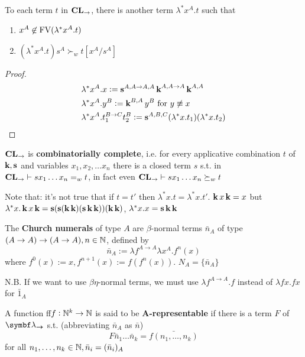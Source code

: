 \documentclass[11pt]{article}
\begin{document}
\begin{theorem}[]
To each term \(t\) in \(\operatorname{\textbf{CL}}_\to\), there is another term \(\lambda^*x^A.t\) such
that
\begin{enumerate}
\item \(x^A\not\in\text{FV}(\lambda^*x^A.t)\)
\item \((\lambda^*x^A.t)s^A\succ_wt[x^A/s^A]\)
\end{enumerate}
\end{theorem}
\begin{proof}
\begin{align*}
&\lambda^*x^A.x:=\operatorname{\textbf{s}}^{A,A\to A,A}\operatorname{\textbf{k}}^{A,A\to A}\operatorname{\textbf{k}}^{A,A}\\
&\lambda^*x^A.y^B:=\operatorname{\textbf{k}}^{B,A}y^B\text{ for }y\not\equiv x\\
&\lambda^*x^A.t_1^{B\to C}t_2^B:=\operatorname{\textbf{s}}^{A,B,C}(\lambda^*x.t_1)(\lambda^*x.t_2)
\end{align*}
\end{proof}

\begin{corollary}[]
\(\operatorname{\textbf{CL}}_\to\) is \textbf{combinatorially complete}, i.e. for every applicative
combination \(t\) of \(\operatorname{\textbf{k}},\operatorname{\textbf{s}}\) and variables \(x_1,x_2,\dots x_n\) there is a
closed term \(s\) s.t. in \(\operatorname{\textbf{CL}}_\to\vdash sx_1\dots x_n=_w t\), in fact even
\(\operatorname{\textbf{CL}}_\to\vdash sx_1\dots x_n\succeq_w t\)
\end{corollary}

\begin{remark}
Note that: it's not true that if \(t=t'\) then \(\lambda^*x.t=\lambda^*x.t'\). 
\(\operatorname{\textbf{k}} x\operatorname{\textbf{k}}=x\) but \(\lambda^*x.\operatorname{\textbf{k}} x\operatorname{\textbf{k}}=\operatorname{\textbf{s}}(\operatorname{\textbf{s}}(\operatorname{\textbf{k}}\operatorname{\textbf{k}})(\operatorname{\textbf{s}}\operatorname{\textbf{k}}\operatorname{\textbf{k}}))(\operatorname{\textbf{k}}\operatorname{\textbf{k}})\),
\(\lambda^*x.x=\operatorname{\textbf{s}}\operatorname{\textbf{k}}\operatorname{\textbf{k}}\)
\end{remark}

\begin{definition}[]
The \textbf{Church numerals} of type \(A\) are \(\beta\)-normal terms \(\bar{n}_A\) of type 
\((A\to A)\to(A\to A), n\in\mathbb{N}\), defined by
\begin{equation*}
\bar{n}_A:=\lambda f^{A\to A}\lambda x^A.f^n(x)
\end{equation*}
where \(f^0(x):=x,f^{n+1}(x):=f(f^n(x))\). \(N_A=\{\bar{n}_A\}\)
\end{definition}
N.B. If we want to use \(\beta \eta\)-normal terms, we must use \(\lambda f^{A\to
   A}.f\) instead of \(\lambda fx.fx\) for \(\bar{1}_A\)

\begin{definition}[]
A function ff\(f:\mathbb{N}^k\to\mathbb{N}\) is said to be \textbf{A-representable} if there is a term \(F\)
of \(\blambda_{\bto}\) s.t. (abbreviating \(\bar{n}_A\) as \(\bar{n}\))
\begin{equation*}
F\bar{n}_1\dots\bar{n}_k=\bar{f(n_1,\dots,n_k)}
\end{equation*}
for all \(n_1,\dots,n_k\in\mathbb{N},\bar{n}_i=(\bar{n}_i)_A\)
\end{definition}
\end{document}
